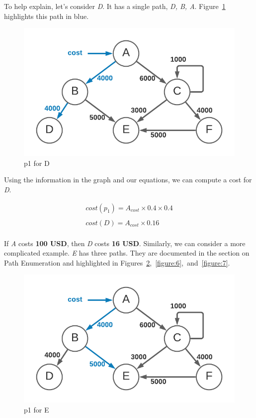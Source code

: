 \documentclass[10pt, a4paper, twocolumn]{article}
\begin{document}
      To help explain, let's consider \textit{D}.
      It has a single path, \textit{D, B, A}.
      Figure~\ref{figure:4} highlights this path in blue.

      \begin{figure}[H]
        \centering
        \includegraphics[width=\linewidth]{./cost-attribution-cost-d.png}
        \caption{p1 for D}
        \label{figure:4}
      \end{figure}

      Using the information in the graph and our equations, we can compute a cost for \textit{D}.

      \begin{gather*}
        cost(p_{1}) = A_{cost} \times 0.4 \times 0.4 \\
        \\
        cost(D) = A_{cost} \times 0.16 \\
      \end{gather*}

      If \textit{A} costs \textbf{100 USD}, then \textit{D} costs \textbf{16 USD}.
      Similarly, we can consider a more complicated example.
      \textit{E} has three paths.
      They are documented in the section on Path Enumeration and
      highlighted in Figures~\ref{figure:5},~\ref{figure:6},~and~\ref{figure:7}.

      \begin{figure}[H]
        \centering
        \includegraphics[width=\linewidth]{./cost-attribution-cost-ep1.png}
        \caption{p1 for E}
        \label{figure:5}
      \end{figure}
\end{document}
